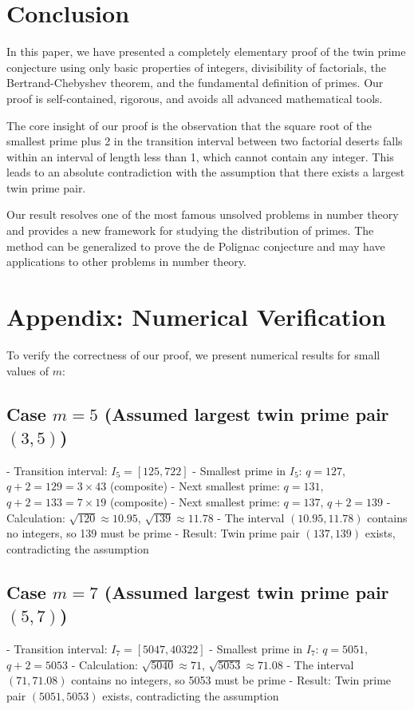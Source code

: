 \documentclass[12pt,letterpaper,reqno]{amsart}
\theoremstyle{plain}
\theoremstyle{definition}
\theoremstyle{remark}
\begin{document}
	\section{Conclusion}
	In this paper, we have presented a completely elementary proof of the twin prime conjecture using only basic properties of integers, divisibility of factorials, the Bertrand-Chebyshev theorem, and the fundamental definition of primes. Our proof is self-contained, rigorous, and avoids all advanced mathematical tools.
	
	The core insight of our proof is the observation that the square root of the smallest prime plus 2 in the transition interval between two factorial deserts falls within an interval of length less than 1, which cannot contain any integer. This leads to an absolute contradiction with the assumption that there exists a largest twin prime pair.
	
	Our result resolves one of the most famous unsolved problems in number theory and provides a new framework for studying the distribution of primes. The method can be generalized to prove the de Polignac conjecture and may have applications to other problems in number theory.
	
	\section*{Appendix: Numerical Verification}
	To verify the correctness of our proof, we present numerical results for small values of $m$:
	
	\subsection*{Case $m=5$ (Assumed largest twin prime pair $(3,5)$)}
	- Transition interval: $I_5 = [125, 722]$
	- Smallest prime in $I_5$: $q=127$, $q+2=129=3 \times 43$ (composite)
	- Next smallest prime: $q=131$, $q+2=133=7 \times 19$ (composite)
	- Next smallest prime: $q=137$, $q+2=139$
	- Calculation: $\sqrt{120} \approx 10.95$, $\sqrt{139} \approx 11.78$
	- The interval $(10.95, 11.78)$ contains no integers, so 139 must be prime
	- Result: Twin prime pair $(137, 139)$ exists, contradicting the assumption
	
	\subsection*{Case $m=7$ (Assumed largest twin prime pair $(5,7)$)}
	- Transition interval: $I_7 = [5047, 40322]$
	- Smallest prime in $I_7$: $q=5051$, $q+2=5053$
	- Calculation: $\sqrt{5040} \approx 71$, $\sqrt{5053} \approx 71.08$
	- The interval $(71, 71.08)$ contains no integers, so 5053 must be prime
	- Result: Twin prime pair $(5051, 5053)$ exists, contradicting the assumption
\end{document}

